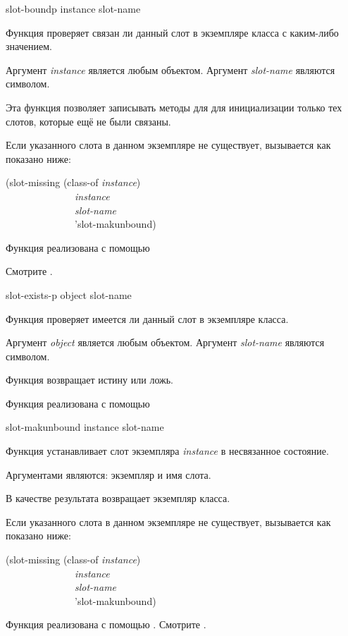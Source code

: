 \begin{defun}[Функция]
slot-boundp instance slot-name

Функция  проверяет связан ли данный слот в экземпляре
класса с каким-либо значением.

Аргумент \emph{instance} является любым объектом. Аргумент \emph{slot-name}
являются символом.

Эта функция позволяет записывать  методы для
 для инициализации только тех слотов, которые ещё не
были связаны.

Если указанного слота в данном экземпляре не существует, вызывается
 как показано ниже:
\begin{lisp}
(slot-missing (class-of \emph{instance}) \\
~~~~~~~~~~~~~~\emph{instance} \\
~~~~~~~~~~~~~~\emph{slot-name} \\
~~~~~~~~~~~~~~'slot-makunbound)
\end{lisp}

Функция  реализована с помощью 

Смотрите .
\end{defun}


\begin{defun}[Функция]
slot-exists-p object slot-name

Функция  проверяет имеется ли данный слот в экземпляре
класса.

Аргумент \emph{object} является любым объектом. Аргумент \emph{slot-name}
являются символом.

Функция  возвращает истину или ложь.

Функция  реализована с помощью 
\end{defun}


\begin{defun}[Функция]
slot-makunbound instance slot-name

Функция  устанавливает слот экземпляра \emph{instance} в
несвязанное состояние.

Аргументами  являются: экземпляр и имя слота.

В качестве результата возвращает экземпляр класса.

Если указанного слота в данном экземпляре не существует, вызывается
 как показано ниже:
\begin{lisp}
(slot-missing (class-of \emph{instance}) \\
~~~~~~~~~~~~~~\emph{instance} \\
~~~~~~~~~~~~~~\emph{slot-name} \\
~~~~~~~~~~~~~~'slot-makunbound)
\end{lisp}

Функция  реализована с помощью
.
Смотрите .
\end{defun}

